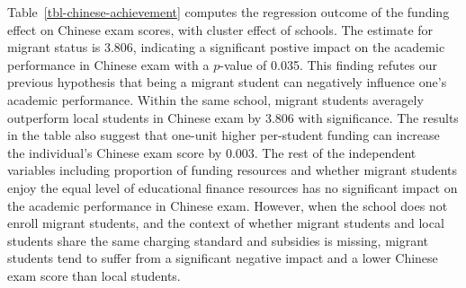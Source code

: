\documentclass[
  man,
  floatsintext,
  longtable,
  nolmodern,
  notxfonts,
  notimes,
  colorlinks=true,linkcolor=blue,citecolor=blue,urlcolor=blue]{apa7}
\begin{document}
Table~\ref{tbl-chinese-achievement} computes the regression outcome of
the funding effect on Chinese exam scores, with cluster effect of
schools. The estimate for migrant status is 3.806, indicating a
significant postive impact on the academic performance in Chinese exam
with a \(p\)-value of 0.035. This finding refutes our previous
hypothesis that being a migrant student can negatively influence one's
academic performance. Within the same school, migrant students averagely
outperform local students in Chinese exam by 3.806 with significance.
The results in the table also suggest that one-unit higher per-student
funding can increase the individual's Chinese exam score by 0.003. The
rest of the independent variables including proportion of funding
resources and whether migrant students enjoy the equal level of
educational finance resources has no significant impact on the academic
performance in Chinese exam. However, when the school does not enroll
migrant students, and the context of whether migrant students and local
students share the same charging standard and subsidies is missing,
migrant students tend to suffer from a significant negative impact and a
lower Chinese exam score than local students.
\end{document}
